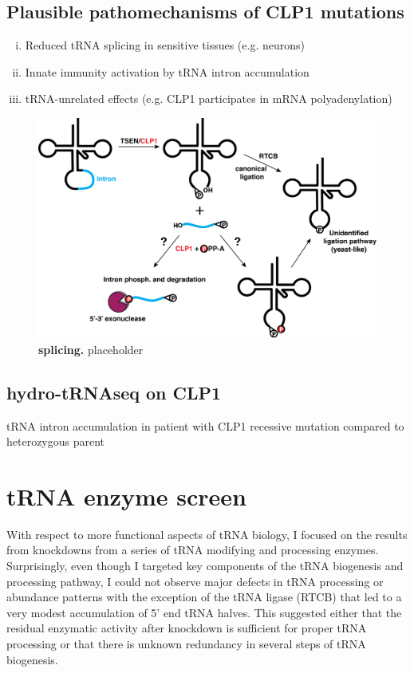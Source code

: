 \documentclass[12pt]{rockefeller}
\begin{document}
\subsection{Plausible pathomechanisms of CLP1 mutations}
\begin{enumerate}[i)]
\item Reduced tRNA splicing in sensitive tissues (e.g. neurons)
\item Innate immunity activation by tRNA intron accumulation
\item tRNA-unrelated effects (e.g. CLP1 participates in mRNA polyadenylation)
\end{enumerate}

\begin{figure}[!ht]%
\centering
\includegraphics[width=\textwidth]{splicing2_v2.png}%
\caption[spliciing]
{\textbf{splicing.}
placeholder}
\centering
\label{splicing}%
\end{figure}



\subsection{hydro-tRNAseq on CLP1}
tRNA intron accumulation in patient with CLP1 recessive mutation compared to heterozygous parent

\section{tRNA enzyme screen}
With respect to more functional aspects of tRNA biology, I focused on the results from knockdowns from a series of tRNA modifying and processing enzymes. Surprisingly, even though I targeted key components of the tRNA biogenesis and processing pathway, I could not observe major defects in tRNA processing or abundance patterns with the exception of the tRNA ligase (RTCB) that led to a very modest accumulation of 5’ end tRNA halves. This suggested either that the residual enzymatic activity after knockdown is sufficient for proper tRNA processing or that there is unknown redundancy in several steps of tRNA biogenesis. 
\end{document}
